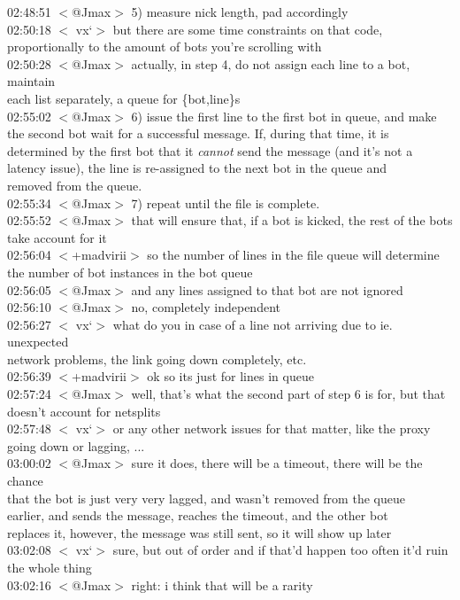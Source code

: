 \documentclass{article}
\begin{document}
02:48:51 $<$@Jmax$>$ 5) measure nick length, pad accordingly\\
02:50:18 $<$ vx`$>$ but there are some time constraints on that code,\\\indent proportionally to the amount of bots you're scrolling with\\
02:50:28 $<$@Jmax$>$ actually, in step 4, do not assign each line to a bot, maintain\\\indent each list separately, a queue for \{bot,line\}s\\
02:55:02 $<$@Jmax$>$ 6) issue the first line to the first bot in queue, and make\\\indent the second bot wait for a successful message. If, during that time, it is\\\indent determined by the first bot that it \emph{cannot} send the message (and it's not a\\\indent latency issue), the line is re-assigned to the next bot in the queue and\\\indent removed from the queue.\\
02:55:34 $<$@Jmax$>$ 7) repeat until the file is complete.\\
02:55:52 $<$@Jmax$>$ that will ensure that, if a bot is kicked, the rest of the bots\\\indent take account for it\\
02:56:04 $<$+madvirii$>$ so the number of lines in the file queue will determine\\\indent the number of bot instances in the bot queue\\
02:56:05 $<$@Jmax$>$ and any lines assigned to that bot are not ignored\\
02:56:10 $<$@Jmax$>$ no, completely independent\\
02:56:27 $<$ vx`$>$ what do you in case of a line not arriving due to ie. unexpected\\\indent network problems, the link going down completely, etc.\\
02:56:39 $<$+madvirii$>$ ok so its just for lines in queue\\
02:57:24 $<$@Jmax$>$ well, that's what the second part of step 6 is for, but that\\\indent doesn't account for netsplits\\
02:57:48 $<$ vx`$>$ or any other network issues for that matter, like the proxy\\\indent going down or lagging, ...\\
03:00:02 $<$@Jmax$>$ sure it does, there will be a timeout, there will be the chance\\\indent that the bot is just very very lagged, and wasn't removed from the queue\\\indent earlier, and sends the message, reaches the timeout, and the other bot\\\indent replaces it, however, the message was still sent, so it will show up later\\
03:02:08 $<$ vx`$>$ sure, but out of order and if that'd happen too often it'd ruin\\\indent the whole thing\\
03:02:16 $<$@Jmax$>$ right: i think that will be a rarity
\end{document}

